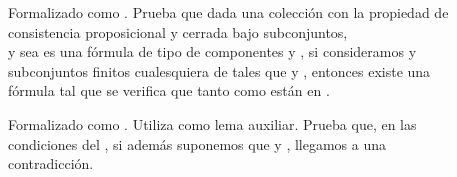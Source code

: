 \begin{isabellebody}
\begin{isamarkuptext}
  \begin{description}
    \item[] Formalizado como . Prueba que dada  una 
    colección con la propiedad de consistencia proposicional y cerrada bajo subconjuntos,\\  y 
    sea  es una fórmula de tipo \isa{{\isasymbeta}} de componentes  y , si consideramos  y  
    subconjuntos finitos cualesquiera de  tales que  y , entonces existe una 
    fórmula  tal que se verifica que tanto  como  están en . 
    \item[] Formalizado como . Utiliza 
     como lema auxiliar. Prueba que, en las condiciones del , 
    si además suponemos que  y , llegamos a una contradicción.
  \end{description} 


\end{isamarkuptext}
\end{isabellebody}
